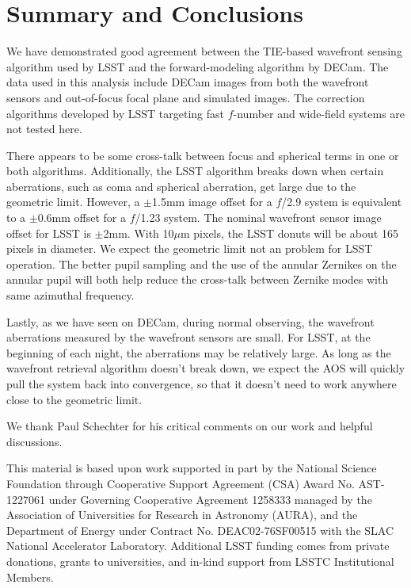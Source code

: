 \documentclass[]{spie}  %
\begin{document}
\section{Summary and Conclusions}
\label{sec:summary}

We have demonstrated good agreement between the TIE-based wavefront sensing algorithm used by LSST 
and the forward-modeling algorithm by DECam.
The data used in this analysis include
DECam images from both the wavefront sensors and out-of-focus focal plane
and simulated images.
The correction algorithms developed by LSST targeting fast $f$-number and wide-field systems are not tested here.

There appears to be some cross-talk between focus and spherical terms in one or both algorithms.
Additionally, the LSST algorithm breaks down when certain aberrations,
such as coma and spherical aberration, get large due to the geometric limit.
However, 
a $\pm$1.5mm image offset for a $f$/2.9 system is equivalent to a $\pm$0.6mm offset for a $f$/1.23 system.
The nominal wavefront sensor image offset for LSST is $\pm$2mm. 
With 10$\mu$m pixels, the LSST donuts will be about 165 pixels in diameter.
We expect the geometric limit not an problem for LSST operation.
The better pupil sampling and the use of the annular Zernikes on the annular pupil will both help reduce the cross-talk between Zernike modes with same azimuthal frequency.

Lastly, as we have seen on DECam, during normal observing, the wavefront aberrations measured by the wavefront sensors are small.
For LSST, at the beginning of each night, the aberrations may be relatively large.
As long as the wavefront retrieval algorithm doesn't break down, we expect the AOS will quickly pull the system back into convergence, so that it doesn't need to work anywhere close to the geometric limit.


\acknowledgments %

We thank Paul Schechter for his critical comments on our work and helpful discussions.
 
This material is based upon work supported in part by the National Science Foundation through Cooperative Support Agreement (CSA) Award No. AST-1227061 under Governing Cooperative Agreement 1258333 managed by the Association of Universities for Research in Astronomy (AURA), and the Department of Energy under Contract No. DEAC02-76SF00515 with the SLAC National Accelerator Laboratory. Additional LSST funding comes from private donations, grants to universities, and in-kind support from LSSTC Institutional Members.

\def\pasp{Publications of the Astronomical Society of the Pacific}%

\end{document}
